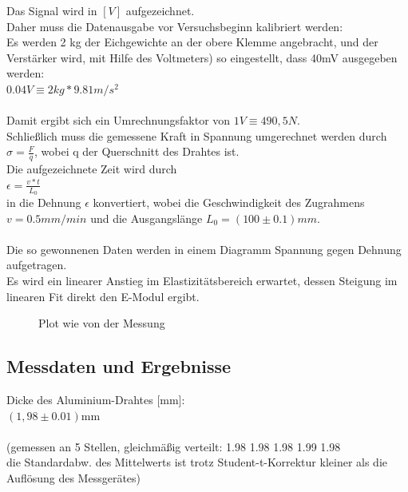 \documentclass[12pt,a4paper]{article}
\begin{document}
\begin{multicols}{2}
Das Signal wird in $[V]$ aufgezeichnet.\\
Daher muss die Datenausgabe vor Versuchsbeginn kalibriert werden:\\
Es werden 2 kg der Eichgewichte an der obere Klemme angebracht, und der Verstärker wird, mit Hilfe des Voltmeters) so eingestellt, dass 40mV ausgegeben werden:\\
$0.04 V \equiv 2 kg * 9.81 m/s^2 $\\
\\
Damit ergibt sich ein Umrechnungsfaktor von $1V \equiv 490,5 N $.\\
Schließlich muss die gemessene Kraft in Spannung umgerechnet werden durch $\sigma = \frac{F}{q}$, wobei q der Querschnitt des Drahtes ist.\\
Die aufgezeichnete Zeit wird durch\\
$ \epsilon = \frac{v*t}{L_{0}} $\\
in die Dehnung $\epsilon$ konvertiert, wobei die Geschwindigkeit des Zugrahmens\\
 $v = 0.5 mm/min$ und die Ausgangslänge $ L_{0} = (100 \pm 0.1) mm $.\\
\\
Die so gewonnenen Daten werden in einem Diagramm Spannung gegen Dehnung aufgetragen.\\
Es wird ein linearer Anstieg im Elastizitätsbereich erwartet, dessen Steigung im linearen Fit direkt den E-Modul ergibt.\\

\begin{figure}[H]
    	\caption{Plot wie von der Messung}
	\label{fig:orig_Vs_plot}
\end{figure}


\subsection{Messdaten und Ergebnisse}
Dicke des Aluminium-Drahtes [mm]:\\
$(1,98\pm 0.01)$mm\\
\\
(gemessen an 5 Stellen, gleichmäßig verteilt:
1.98
1.98
1.98
1.99
1.98\\
die Standardabw. des Mittelwerts ist trotz Student-t-Korrektur kleiner als die Auflösung des Messgerätes)\\


\end{multicols}
\end{document}
